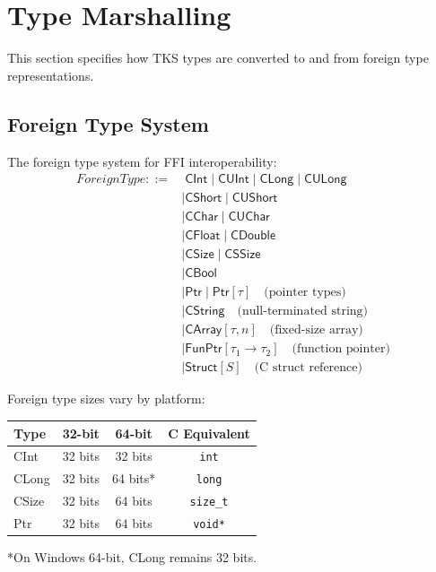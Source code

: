 \section{Type Marshalling}
\label{sec:type-marshalling}

This section specifies how TKS types are converted to and from foreign type representations.

\subsection{Foreign Type System}
\label{subsec:foreign-types}

\begin{definition}
\label{def:foreign-types}
The foreign type system for FFI interoperability:
\begin{align}
\mathit{ForeignType} ::=&\; \mathsf{CInt} \mid \mathsf{CUInt} \mid \mathsf{CLong} \mid \mathsf{CULong} \\
    &\mid \mathsf{CShort} \mid \mathsf{CUShort} \\
    &\mid \mathsf{CChar} \mid \mathsf{CUChar} \\
    &\mid \mathsf{CFloat} \mid \mathsf{CDouble} \\
    &\mid \mathsf{CSize} \mid \mathsf{CSSize} \\
    &\mid \mathsf{CBool} \\
    &\mid \mathsf{Ptr} \mid \mathsf{Ptr}[\tau] \quad \text{(pointer types)} \\
    &\mid \mathsf{CString} \quad \text{(null-terminated string)} \\
    &\mid \mathsf{CArray}[\tau, n] \quad \text{(fixed-size array)} \\
    &\mid \mathsf{FunPtr}[\tau_1 \to \tau_2] \quad \text{(function pointer)} \\
    &\mid \mathsf{Struct}[S] \quad \text{(C struct reference)}
\end{align}
\end{definition}

\begin{definition}
\label{def:platform-sizes}
Foreign type sizes vary by platform:
\begin{center}
\begin{tabular}{lccc}
\toprule
\textbf{Type} & \textbf{32-bit} & \textbf{64-bit} & \textbf{C Equivalent} \\
\midrule
\textsf{CInt} & 32 bits & 32 bits & \texttt{int} \\
\textsf{CLong} & 32 bits & 64 bits* & \texttt{long} \\
\textsf{CSize} & 32 bits & 64 bits & \texttt{size\_t} \\
\textsf{Ptr} & 32 bits & 64 bits & \texttt{void*} \\
\bottomrule
\end{tabular}
\end{center}
*On Windows 64-bit, \textsf{CLong} remains 32 bits.
\end{definition}

